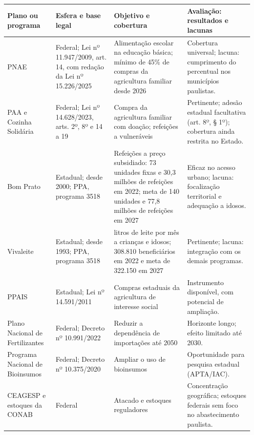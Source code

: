\documentclass[
	12pt,				%
	openright,			%
	oneside,			%
	a4paper,			%
	chapter=TITLE,		%
	section=TITLE,		%
	english,			%
	french,				%
	spanish,			%
	brazil,				%
 ]{abntex2}
\begin{document}
\begin{quadro}[!htbp]
\centering
\caption{Planos e programas em vigor e sua avaliação}
\label{qua:planos-vigor}
\footnotesize
\renewcommand{\arraystretch}{1.05}
\setlength{\tabcolsep}{3pt}
\begin{tabularx}{\textwidth}{|>{\raggedright\arraybackslash}p{2.4cm}|>{\raggedright\arraybackslash}p{3.0cm}|>{\raggedright\arraybackslash}p{3.4cm}|>{\raggedright\arraybackslash}X|}
\hline
\textbf{Plano ou programa} & \textbf{Esfera e base legal} & \textbf{Objetivo e cobertura} & \textbf{Avaliação: resultados e lacunas} \\
\hline
PNAE & Federal; Lei nº 11.947/2009, art. 14, com redação da Lei nº 15.226/2025 & Alimentação escolar na educação básica; mínimo de 45\% de compras da agricultura familiar desde 2026 & Cobertura universal; lacuna: cumprimento do percentual nos municípios paulistas. \\
\hline
PAA e Cozinha Solidária & Federal; Lei nº 14.628/2023, arts. 2º, 8º e 14 a 19 & Compra da agricultura familiar com doação; refeições a vulneráveis & Pertinente; adesão estadual facultativa (art. 8º, § 1º); cobertura ainda restrita no Estado. \\
\hline
Bom Prato & Estadual; desde 2000; PPA, programa 3518 & Refeições a preço subsidiado: 73 unidades fixas e 30,3 milhões de refeições em 2022; meta de 140 unidades e 77,8 milhões de refeições em 2027 \cite{saopaulo2024ppa} & Eficaz no acesso urbano; lacuna: focalização territorial e adequação a idosos. \\
\hline
Vivaleite & Estadual; desde 1993; PPA, programa 3518 & 15 litros de leite por mês a crianças e idosos; 308.810 beneficiários em 2022 e meta de 322.150 em 2027 \cite{saopaulo2024ppa} & Pertinente; lacuna: integração com os demais programas. \\
\hline
PPAIS & Estadual; Lei nº 14.591/2011 & Compras estaduais da agricultura de interesse social & Instrumento disponível, com potencial de ampliação. \\
\hline
Plano Nacional de Fertilizantes & Federal; Decreto nº 10.991/2022 & Reduzir a dependência de importações até 2050 & Horizonte longo; efeito limitado até 2030. \\
\hline
Programa Nacional de Bioinsumos & Federal; Decreto nº 10.375/2020 & Ampliar o uso de bioinsumos & Oportunidade para pesquisa estadual (APTA/IAC). \\
\hline
CEAGESP e estoques da CONAB & Federal & Atacado e estoques reguladores & Concentração geográfica; estoques federais sem foco no abastecimento paulista. \\

\end{tabularx}
\end{quadro}
\end{document}
